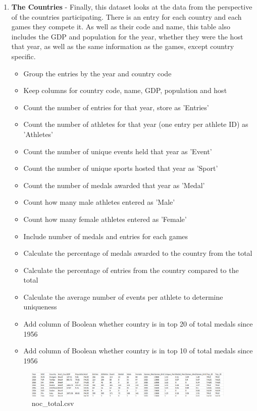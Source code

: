 \documentclass[a4 paper, 12pt]{article}
\begin{document}
\begin{enumerate}
            \item \textbf{The Countries} - Finally, this dataset looks at the data from the perspective of the countries participating. There is an entry for each country and each games they compete it. As well as their code and name, this table also includes the GDP and population for the year, whether they were the host that year, as well as the same information as the games, except country specific.
                \begin{itemize}
                    \item Group the entries by the year and country code
                    \item Keep columns for country code, name, GDP, population and host 
                    \item Count the number of entries for that year, store as 'Entries'
                    \item Count the number of athletes for that year (one entry per athlete ID) as 'Athletes'
                    \item Count the number of unique events held that year as 'Event'
                    \item Count the number of unique sports hosted that year as 'Sport'
                    \item Count the number of medals awarded that year as 'Medal'
                    \item Count how many male athletes entered as 'Male'
                    \item Count how many female athletes entered as 'Female'
                    \item Include number of medals and entries for each games
                    \item Calculate the percentage of medals awarded to the country from the total
                    \item Calculate the percentage of entries from the country compared to the total
                    \item Calculate the average number of events per athlete to determine uniqueness
                    \item Add column of Boolean whether country is in top 20 of total medals since 1956
                    \item Add column of Boolean whether country is in top 10 of total medals since 1956
                \end{itemize}
                \begin{figure} [H]
                    \centering
                    \includegraphics[width=0.95\textwidth, frame]
                        {./images/data/noc_total.png}      
                        \caption{noc\_total.csv} 
                \end{figure}

            \end{enumerate}
\end{document}
